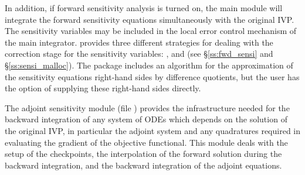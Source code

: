 In addition, if forward sensitivity analysis is turned on, the main module 
will integrate the forward sensitivity equations simultaneously with the original
IVP. The sensitivity variables may be included in the local error control
mechanism of the main integrator.
{\cvodes} provides three different strategies for dealing with the correction
stage for the sensitivity variables: ,  and
 (see \S\ref{ss:fwd_sensi} and \S\ref{ss:sensi_malloc}).
The {\cvodes} package includes an algorithm for the approximation of the
sensitivity equations right-hand sides by difference quotients, but the user has
the option of supplying these right-hand sides directly.

The adjoint sensitivity module (file ) provides the infrastructure needed for the 
backward integration of any system of ODEs which depends on the solution 
of the original IVP, in particular the adjoint system and any quadratures required
in evaluating the gradient of the objective functional.  This module deals with
the setup of the checkpoints, the interpolation of the forward solution during
the backward integration, and the backward integration of the adjoint equations.


